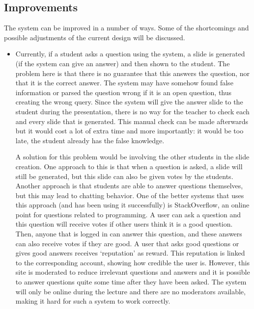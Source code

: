 \documentclass[11pt]{article}
\begin{document}
\subsection{Improvements}
The system can be improved in a number of ways. Some of the shortcomings and possible adjustments of the current design will be discussed. 
\begin{itemize}
\item Currently, if a student asks a question using the system, a slide is generated (if the system can give an answer) and then shown to the student. The problem here is that there is no guarantee that this answers the question, nor that it is the correct answer. The system may have somehow found false information or parsed the question wrong if it is an open question, thus creating the wrong query. Since the system will give the answer slide to the student during the presentation, there is no way for the teacher to check each and every slide that is generated. This manual check can be made afterwards but it would cost a lot of extra time and more importantly: it would be too late, the student already has the false knowledge. 

A solution for this problem would be involving the other students in the slide creation. One approach to this is that when a question is asked, a slide will still be generated, but this slide can also be given votes by the students. Another approach is that students are able to answer questions themselves, but this may lead to chatting behavior. One of the better systems that uses this approach (and has been using it successfully) is StackOverflow, an online point for questions related to programming. A user can ask a question and this question will receive votes if other users think it is a good question. Then, anyone that is logged in can answer this question, and these answers can also receive votes if they are good. A user that asks good questions or gives good answers receives `reputation' as reward. This reputation is linked to the corresponding account, showing how credible the user is. However, this site is moderated to reduce irrelevant questions and answers and it is possible to answer questions quite some time after they have been asked. The system will only be online during the lecture and there are no moderators available, making it hard for such a system to work correctly. 


\end{itemize}
\end{document}
